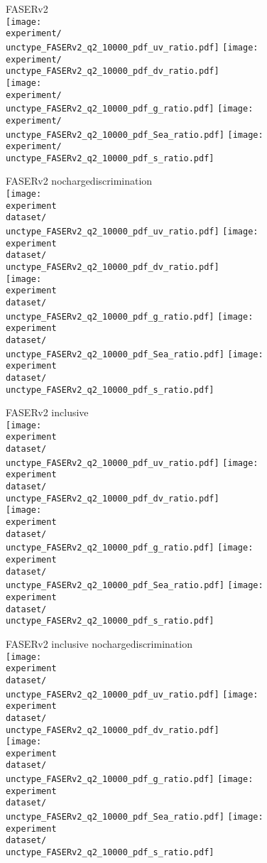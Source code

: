 \documentclass{article}
\newcommand{\figw}{70mm}
\newcommand{\experiment}{FASERv2}
\newcommand{\unctype}{uncor}
\begin{document}
FASERv2\\
\texttt{[image: \\experiment/\\unctype\_FASERv2\_q2\_10000\_pdf\_uv\_ratio.pdf]}
\texttt{[image: \\experiment/\\unctype\_FASERv2\_q2\_10000\_pdf\_dv\_ratio.pdf]}\\
\texttt{[image: \\experiment/\\unctype\_FASERv2\_q2\_10000\_pdf\_g\_ratio.pdf]}
\texttt{[image: \\experiment/\\unctype\_FASERv2\_q2\_10000\_pdf\_Sea\_ratio.pdf]}
\texttt{[image: \\experiment/\\unctype\_FASERv2\_q2\_10000\_pdf\_s\_ratio.pdf]}

\newpage

FASERv2 nochargediscrimination\\
\newcommand{\dataset}{_nochargediscrimination}
\texttt{[image: \\experiment\\dataset/\\unctype\_FASERv2\_q2\_10000\_pdf\_uv\_ratio.pdf]}
\texttt{[image: \\experiment\\dataset/\\unctype\_FASERv2\_q2\_10000\_pdf\_dv\_ratio.pdf]}\\
\texttt{[image: \\experiment\\dataset/\\unctype\_FASERv2\_q2\_10000\_pdf\_g\_ratio.pdf]}
\texttt{[image: \\experiment\\dataset/\\unctype\_FASERv2\_q2\_10000\_pdf\_Sea\_ratio.pdf]}
\texttt{[image: \\experiment\\dataset/\\unctype\_FASERv2\_q2\_10000\_pdf\_s\_ratio.pdf]}

\newpage

FASERv2 inclusive\\
\renewcommand{\dataset}{_inclusive}
\texttt{[image: \\experiment\\dataset/\\unctype\_FASERv2\_q2\_10000\_pdf\_uv\_ratio.pdf]}
\texttt{[image: \\experiment\\dataset/\\unctype\_FASERv2\_q2\_10000\_pdf\_dv\_ratio.pdf]}\\
\texttt{[image: \\experiment\\dataset/\\unctype\_FASERv2\_q2\_10000\_pdf\_g\_ratio.pdf]}
\texttt{[image: \\experiment\\dataset/\\unctype\_FASERv2\_q2\_10000\_pdf\_Sea\_ratio.pdf]}
\texttt{[image: \\experiment\\dataset/\\unctype\_FASERv2\_q2\_10000\_pdf\_s\_ratio.pdf]}

\newpage

FASERv2 inclusive nochargediscrimination\\
\renewcommand{\dataset}{_inclusive_nochargediscrimination}
\texttt{[image: \\experiment\\dataset/\\unctype\_FASERv2\_q2\_10000\_pdf\_uv\_ratio.pdf]}
\texttt{[image: \\experiment\\dataset/\\unctype\_FASERv2\_q2\_10000\_pdf\_dv\_ratio.pdf]}\\
\texttt{[image: \\experiment\\dataset/\\unctype\_FASERv2\_q2\_10000\_pdf\_g\_ratio.pdf]}
\texttt{[image: \\experiment\\dataset/\\unctype\_FASERv2\_q2\_10000\_pdf\_Sea\_ratio.pdf]}
\texttt{[image: \\experiment\\dataset/\\unctype\_FASERv2\_q2\_10000\_pdf\_s\_ratio.pdf]}
\end{document}

